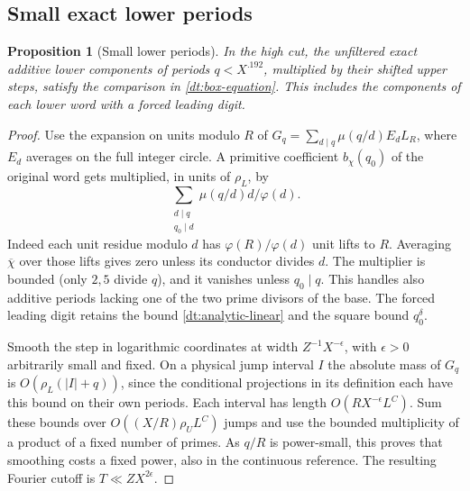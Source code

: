 \documentclass[11pt,a4paper]{article}
\theoremstyle{paperplain}
\newtheorem{proposition}[theorem]{Proposition}
\numberwithin{equation}{section}
\begin{document}
\subsection{Small exact lower periods}

\begin{proposition}[Small lower periods]\label{dt:analytic-small-periods}
In the high cut, the unfiltered exact additive lower components
of periods \(q<X^{.192}\), multiplied by their shifted upper steps,
satisfy the comparison in \eqref{dt:box-equation}. This includes the
components of each lower word with a forced leading digit.
\end{proposition}

\begin{proof}
Use the expansion on units modulo \(R\) of
\(G_q=\sum_{d\mid q}\mu(q/d)E_d L_R\), where \(E_d\) averages on
the full integer circle. A primitive coefficient \(b_\chi(q_0)\)
of the original word gets multiplied, in units of \(\rho_L\), by
\[
             \sum_{\substack{d\mid q\\q_0\mid d}}\mu(q/d)d/\varphi(d).
\]
Indeed each unit residue modulo \(d\) has
\(\varphi(R)/\varphi(d)\) unit lifts to \(R\). Averaging
\(\overline\chi\) over those lifts gives zero unless its conductor
divides \(d\). The multiplier is bounded (only \(2,5\) divide \(q\)),
and it vanishes unless \(q_0\mid q\). This handles also additive
periods lacking one of the two prime divisors of the base. The
forced leading digit retains the bound \eqref{dt:analytic-linear}
and the square bound \(q_0^\delta\).

Smooth the step in logarithmic coordinates at width
\(Z^{-1}X^{-\epsilon}\), with \(\epsilon>0\) arbitrarily small and fixed.
On a physical jump interval \(I\) the absolute mass of \(G_q\)
is \(O(\rho_L(|I|+q))\), since the conditional projections in its
definition each have this bound on their own periods.
Each interval has length \(O(RX^{-\epsilon}L^C)\). Sum these
bounds over \(O((X/R)\rho_U L^C)\) jumps and use the bounded
multiplicity of a product of a fixed number of primes. As
\(q/R\) is power-small, this proves that smoothing costs a fixed
power, also in the continuous reference. The resulting Fourier
cutoff is \(T\ll ZX^{2\epsilon}\).


\end{proof}
\end{document}
